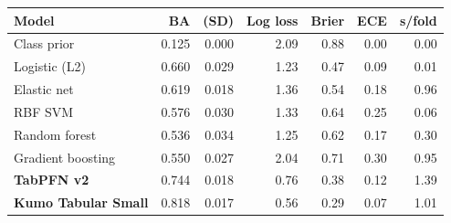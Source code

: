 \begin{tabular}{lrrrrrr}
\toprule
Model & BA & (SD) & Log loss & Brier & ECE & s/fold \\
\midrule
Class prior & 0.125 & 0.000 & 2.09 & 0.88 & 0.00 & 0.00 \\
Logistic (L2) & 0.660 & 0.029 & 1.23 & 0.47 & 0.09 & 0.01 \\
Elastic net & 0.619 & 0.018 & 1.36 & 0.54 & 0.18 & 0.96 \\
RBF SVM & 0.576 & 0.030 & 1.33 & 0.64 & 0.25 & 0.06 \\
Random forest & 0.536 & 0.034 & 1.25 & 0.62 & 0.17 & 0.30 \\
Gradient boosting & 0.550 & 0.027 & 2.04 & 0.71 & 0.30 & 0.95 \\
\midrule
\textbf{TabPFN v2} & 0.744 & 0.018 & 0.76 & 0.38 & 0.12 & 1.39 \\
\textbf{Kumo Tabular Small} & 0.818 & 0.017 & 0.56 & 0.29 & 0.07 & 1.01 \\
\bottomrule
\end{tabular}
